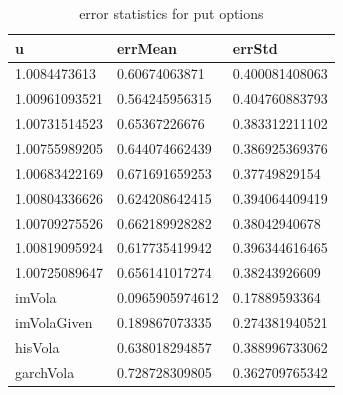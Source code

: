 \begin{table}[H]
\centering
\caption{error statistics for put options}
\label{errp}
\begin{tabular}{l|l|l}
\hline
\textbf{u}&\textbf{errMean}&\textbf{errStd}\\
\hline
1.0084473613&0.60674063871&0.400081408063\\
1.00961093521&0.564245956315&0.404760883793\\
1.00731514523&0.65367226676&0.383312211102\\
1.00755989205&0.644074662439&0.386925369376\\
1.00683422169&0.671691659253&0.37749829154\\
1.00804336626&0.624208642415&0.394064409419\\
1.00709275526&0.662189928282&0.38042940678\\
1.00819095924&0.617735419942&0.396344616465\\
1.00725089647&0.656141017274&0.38243926609\\
imVola&0.0965905974612&0.17889593364\\
imVolaGiven&0.189867073335&0.274381940521\\
hisVola&0.638018294857&0.388996733062\\
garchVola&0.728728309805&0.362709765342\\
\hline
\end{tabular}
\end{table}





